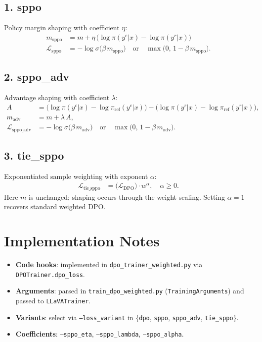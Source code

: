 \documentclass[11pt]{article}
\begin{document}
\subsection*{1. sppo}
Policy margin shaping with coefficient $\eta$:
\begin{align}
 m_{\text{sppo}} &= m + \eta\,\Big(\log\pi(y^{c}|x) - \log\pi(y^{r}|x)\Big) \\
 \mathcal{L}_{\text{sppo}} &= -\log\sigma\big(\beta\, m_{\text{sppo}}\big)\quad\text{or}\quad \max\big(0,\,1-\beta\, m_{\text{sppo}}\big).
\end{align}

\subsection*{2. sppo\_adv}
Advantage shaping with coefficient $\lambda$:
\begin{align}
 A &= \Big(\log\pi(y^{c}|x) - \log\pi_{\text{ref}}(y^{c}|x)\Big) - \Big(\log\pi(y^{r}|x) - \log\pi_{\text{ref}}(y^{r}|x)\Big), \\
 m_{\text{adv}} &= m + \lambda\,A, \\
 \mathcal{L}_{\text{sppo\_adv}} &= -\log\sigma\big(\beta\, m_{\text{adv}}\big)\quad\text{or}\quad \max\big(0,\,1-\beta\, m_{\text{adv}}\big).
\end{align}

\subsection*{3. tie\_sppo}
Exponentiated sample weighting with exponent $\alpha$:
\begin{align}
 \mathcal{L}_{\text{tie\_sppo}} &= \bigg(\mathcal{L}_{\text{DPO}}\bigg)\cdot w^{\alpha}, \quad \alpha \ge 0.
\end{align}
Here $m$ is unchanged; shaping occurs through the weight scaling. Setting $\alpha=1$ recovers standard weighted DPO.

\section*{Implementation Notes}
\begin{itemize}
  \item \textbf{Code hooks}: implemented in \texttt{dpo\_trainer\_weighted.py} via \texttt{DPOTrainer.dpo\_loss}.
  \item \textbf{Arguments}: parsed in \texttt{train\_dpo\_weighted.py} (\texttt{TrainingArguments}) and passed to \texttt{LLaVATrainer}.
  \item \textbf{Variants}: select via \texttt{--loss\_variant} in \{\texttt{dpo}, \texttt{sppo}, \texttt{sppo\_adv}, \texttt{tie\_sppo}\}.
  \item \textbf{Coefficients}: \texttt{--sppo\_eta}, \texttt{--sppo\_lambda}, \texttt{--sppo\_alpha}.
\end{itemize}
\end{document}
